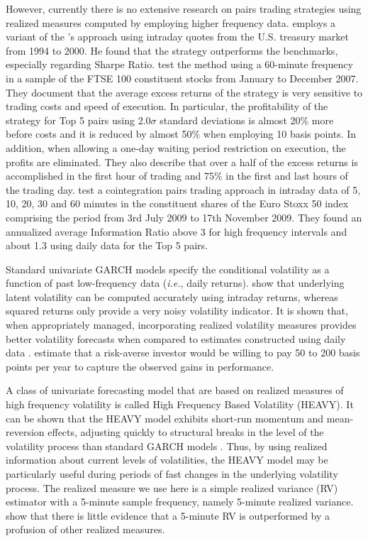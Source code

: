 \documentclass[a4paper,12pt]{report}
\begin{document}
However, currently there is no extensive research on pairs trading strategies using realized measures computed by employing higher frequency data. \citet*{nath2003high} employs a variant of the \citet*{ggr06}'s approach using intraday quotes from the U.S. treasury market from 1994 to 2000. He found that the strategy outperforms the benchmarks, especially regarding Sharpe Ratio. \citet*{bowen2010high} test the method using a 60-minute frequency in a sample of the FTSE 100 constituent stocks from January to December 2007. They document that the average excess returns of the strategy is very sensitive to trading costs and speed of execution. In particular, the profitability of the strategy for Top 5 pairs using 2.0$\sigma$ standard deviations is almost 20\% more before costs and it is reduced by almost 50\% when employing 10 basis points. In addition, when allowing a one-day waiting period restriction on execution, the profits are eliminated. They also describe that over a half of the excess returns is accomplished in the first hour of trading and 75\% in the first and last hours of the trading day. \citet*{dunis2010} test a cointegration pairs trading approach in intraday data of  5, 10, 20, 30 and 60 minutes in the constituent shares of the Euro Stoxx 50 index comprising the period from 3rd July 2009 to 17th November 2009. They found an annualized average Information Ratio above 3 for high frequency intervals and about 1.3 using daily data for the Top 5 pairs.

Standard univariate GARCH models specify the conditional volatility as a function of past low-frequency data (\emph{i.e.}, daily returns). \citet*{andersen2001} show that underlying latent volatility can be computed accurately using intraday returns, whereas squared returns only provide a very noisy volatility indicator. It is shown that, when appropriately managed, incorporating realized volatility measures provides better volatility forecasts when compared to estimates constructed using daily data \citep{ss10,hansen2012realized}. \citet*{fleming2003} estimate that a risk-averse investor would be willing to pay 50 to 200 basis points per year to capture the observed gains in performance.

A class of univariate forecasting model that are based on realized measures of high frequency volatility is called High Frequency Based Volatility (HEAVY). It can be shown that the HEAVY model exhibits short-run momentum and mean-reversion effects, adjusting quickly to structural breaks in the level of the volatility process than standard GARCH models \citep{ss10}. Thus, by using realized information about current levels of volatilities, the HEAVY model may be particularly useful during periods of fast changes in the underlying volatility process. The realized measure we use here is a simple realized variance (RV) estimator with a 5-minute sample frequency, namely 5-minute realized variance. \citet*{liu2015does} show that there is little evidence that a 5-minute RV is outperformed by a profusion of other realized measures.
\end{document}
